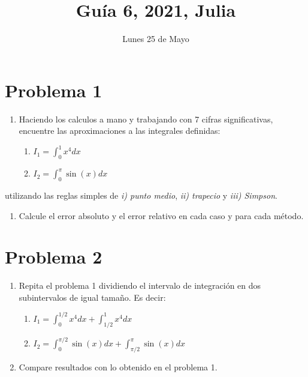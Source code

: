 \documentclass[11pt]{article}
\title{Guía 6, 2021, Julia}
\providecommand{\tightlist}{%
      \setlength{\itemsep}{0pt}\setlength{\parskip}{0pt}}
\begin{document}
    \date{Lunes 25 de Mayo}
    
    \maketitle
    
    

    
    \hypertarget{problema-1}{%
\section*{Problema 1}\label{problema-1}}

\begin{enumerate}
\def\labelenumi{\arabic{enumi}.}
\item
  Haciendo los calculos a mano y trabajando con 7 cifras significativas,
  encuentre las aproximaciones a las integrales definidas:

  \begin{enumerate}
  \def\labelenumii{\alph{enumii}.}
  \item
    \(I_1 = \int_0^1 x^4 dx\)
  \item
    \(I_2 = \int_0^{\pi} \sin{(x)} dx\)
  \end{enumerate}
\end{enumerate}

utilizando las reglas simples de \emph{i) punto medio}, \emph{ii)
trapecio} y \emph{iii) Simpson}.

\begin{enumerate}
\def\labelenumi{\arabic{enumi}.}
\setcounter{enumi}{1}
\tightlist
\item
  Calcule el error absoluto y el error relativo en cada caso y para cada
  método.
\end{enumerate}

    \hypertarget{problema-2}{%
\section*{Problema 2}\label{problema-2}}

\begin{enumerate}
\def\labelenumi{\arabic{enumi}.}
\item
  Repita el problema 1 dividiendo el intervalo de integración en dos
  subintervalos de igual tamaño. Es decir:

  \begin{enumerate}
  \def\labelenumii{\alph{enumii}.}
  \item
    \(I_1=\int_0^{1/2} x^4 dx+ \int_{1/2}^1 x^4 dx\)
  \item
    \(I_2=\int_0^{\pi/2}\sin{(x)}dx+\int_{\pi/2}^{\pi}\sin{(x)} dx\)
  \end{enumerate}
\item
  Compare resultados con lo obtenido en el problema 1.
\end{enumerate}
\end{document}
